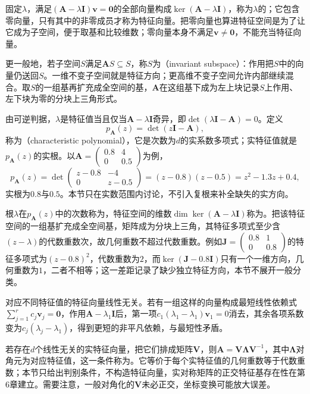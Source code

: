 固定$\lambda$，满足$(\bm A-\lambda\bm I)\bm v=\bm0$的全部向量构成$\ker(\bm A-\lambda\bm I)$，称为$\lambda$的；它包含零向量，只有其中的非零成员才称为特征向量。把零向量也算进特征空间是为了让它成为子空间，便于取基和比较维数；零向量本身不满足$\bm v\neq\bm0$，不能充当特征向量。

更一般地，若子空间$S$满足$\bm A S\subseteq S$，称$S$为（invariant subspace）：作用把$S$中的向量仍送回$S$。一维不变子空间就是特征方向；更高维不变子空间允许内部继续混合。取$S$的一组基再扩充成全空间的基，$\bm A$在这组基下成为左上块记录$S$上作用、左下块为零的分块上三角形式。

由可逆判据，$\lambda$是特征值当且仅当$\bm A-\lambda\bm I$奇异，即$\det(\lambda\bm I-\bm A)=0$。定义
\begin{equation}
 p_{\bm A}(z)=\det(z\bm I-\bm A),
 \label{eq:matrix-analysis-characteristic-polynomial}
\end{equation}
称为（characteristic polynomial），它是次数为$d$的实系数多项式；实特征值就是$p_{\bm A}(z)$的实根。以$\bm A=\begin{pmatrix}0.8&4\\0&0.5\end{pmatrix}$为例，
\[
 p_{\bm A}(z)=\det\begin{pmatrix}z-0.8&-4\\0&z-0.5\end{pmatrix}=(z-0.8)(z-0.5)=z^2-1.3z+0.4,
\]
实根为$0.8$与$0.5$。本节只在实数范围内讨论，不引入复根来补全缺失的实方向。

根$\lambda$在$p_{\bm A}(z)$中的次数称为，特征空间的维数$\dim\ker(\bm A-\lambda\bm I)$称为。把该特征空间的一组基扩充成全空间基，矩阵成为分块上三角，其特征多项式至少含$(z-\lambda)$的代数重数次，故几何重数不超过代数重数。例如$\bm J=\begin{pmatrix}0.8&1\\0&0.8\end{pmatrix}$的特征多项式为$(z-0.8)^2$，代数重数为$2$，而$\ker(\bm J-0.8\bm I)$只有一个一维方向，几何重数为$1$，二者不相等；这一差距记录了缺少独立特征方向，本节不展开一般分类。

对应不同特征值的特征向量线性无关。若有一组这样的向量构成最短线性依赖式$\sum_{j=1}^r c_j\bm v_j=\bm0$，作用$\bm A-\lambda_1\bm I$后，第一项$c_1(\lambda_1-\lambda_1)\bm v_1=0$消去，其余各项系数变为$c_j(\lambda_j-\lambda_1)$，得到更短的非平凡依赖，与最短性矛盾。

若存在$d$个线性无关的实特征向量，把它们排成矩阵$\bm V$，则$\bm A=\bm V\bm\Lambda\bm V^{-1}$，其中$\bm\Lambda$对角元为对应特征值，这一条件称为。它等价于每个实特征值的几何重数等于代数重数；本节只给出判别条件，不构造特征向量，实对称矩阵的正交特征基存在性在第6章建立。需要注意，一般对角化的$\bm V$未必正交，坐标变换可能放大误差。

